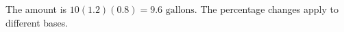 The amount is $10(1.2)(0.8)=\boxed{9.6\text{ gallons}}$. The percentage changes apply to different bases.

